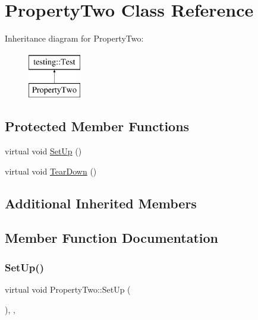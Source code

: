 \hypertarget{classPropertyTwo}{}\section{Property\+Two Class Reference}
\label{classPropertyTwo}
Inheritance diagram for Property\+Two\+:\begin{figure}[H]
\begin{center}
\leavevmode
\includegraphics[height=2.000000cm]{classPropertyTwo}
\end{center}
\end{figure}
\subsection*{Protected Member Functions}
\begin{DoxyCompactItemize}
\item 
virtual void \mbox{\hyperlink{classPropertyTwo_aa3ab39cf4e6c751cb0788c575bf92ca2}{Set\+Up}} ()
\item 
virtual void \mbox{\hyperlink{classPropertyTwo_aa4ffb2b9dddeba69f0f9baf133f06ef2}{Tear\+Down}} ()
\end{DoxyCompactItemize}
\subsection*{Additional Inherited Members}


\subsection{Member Function Documentation}
\mbox{\label{classPropertyTwo_aa3ab39cf4e6c751cb0788c575bf92ca2}} 
\subsubsection{\texorpdfstring{SetUp()}{SetUp()}}
{\footnotesize\ttfamily virtual void Property\+Two\+::\+Set\+Up (\begin{DoxyParamCaption}{ }\end{DoxyParamCaption})\hspace{0.3cm}{\ttfamily [inline]}, {\ttfamily [protected]}, {\ttfamily [virtual]}}



